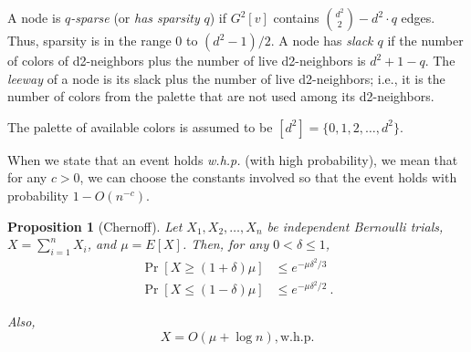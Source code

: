 \documentclass[12pt]{article}
\newtheorem{proposition}[theorem]{Proposition}
\newtheorem{corollary}[theorem]{Corollary}
\begin{document}
A node is \emph{$q$-sparse} (or \emph{has sparsity} $q$) if $G^2[v]$ contains ${d^2 \choose 2} - d^2\cdot q$ edges. Thus, sparsity is in the range $0$ to $(d^2-1)/2$.
A node has \emph{slack $q$} if the number of colors of d2-neighbors plus the number of live d2-neighbors is $d^2+1-q$.
The \emph{leeway} of a node is its slack plus the number of live d2-neighbors; i.e., it is the number of colors from the palette that are not used among its d2-neighbors.

The palette of available colors is assumed to be $[d^2] = \{0,1,2,\ldots, d^2\}$. 

When we state that an event holds \emph{w.h.p.} (with high probability), we mean that for any $c > 0$, we can choose the constants involved so that the event holds with probability $1 - O(n^{-c})$.

\begin{proposition}[Chernoff]
Let $X_1, X_2, \ldots, X_n$ be independent Bernoulli trials,
$X = \sum_{i=1}^n X_i$, and $\mu = E[X]$. Then, for any $0 < \delta \le 1$,
\begin{align}
\label{eq:chernoff-upper}
\Pr[X \ge (1+\delta)\mu] & \le e^{-\mu \delta^2/3}     \\
\label{eq:chernoff-lower}
\Pr[X \le (1-\delta)\mu] & \le e^{-\mu \delta^2/2}\ .
\end{align}
\iffalse
\begin{equation}
\Pr[X \ge (1+\delta)\mu] \le e^{-\mu \delta^2/3} %
\label{eq:chernoff-upper}
\end{equation}
and
\begin{equation}
\Pr[X \le (1-\delta)\mu] \le e^{-\mu \delta^2/2}\ .
\label{eq:chernoff-lower}
\end{equation}
\fi
Also,
\begin{equation}
    X = O(\mu + \log n), \text{w.h.p.}
    \label{eq:concentration}
\end{equation}
\label{prop:chernoff}
\end{proposition}

\iffalse
\begin{corollary}
Let $X_1, X_2, \ldots, X_m$ be independent Bernoulli trials.
Let $X = \sum_{i=1}^n$ and $\mu = E[X]$. Assume $\mu = \Omega(\log n)$. Then, $X = O(\mu)$, w.h.p.
\label{cor:chernoff}
\end{corollary}
\fi
\end{document}
